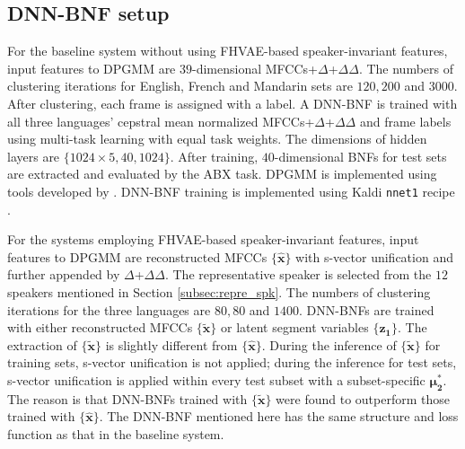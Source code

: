 \documentclass[a4paper]{article}
\begin{document}
\subsection{DNN-BNF setup}
For the baseline system without using FHVAE-based speaker-invariant features,  input features  to DPGMM are  $39$-dimensional MFCCs+$\Delta$+$\Delta\Delta$. 
The numbers of clustering iterations for English, French and Mandarin sets are $120,200$ and $3000$. After clustering, each frame is assigned with a label. A DNN-BNF is trained with all three languages'  cepstral mean normalized MFCCs+$\Delta$+$\Delta\Delta$ and frame labels using  multi-task learning with equal task weights. 
The dimensions of hidden layers are $\{1024\times5,40,1024\}$.
After training, $40$-dimensional BNFs for test sets are extracted and evaluated by the ABX task. DPGMM is implemented using tools developed by \cite{chang2013parallel}. DNN-BNF training is implemented using Kaldi \texttt{nnet1} recipe \cite{povey2011kaldi}.

For the systems employing FHVAE-based speaker-invariant features,  input features to DPGMM are reconstructed MFCCs $\{\bm{\hat{x}}\}$ with s-vector unification and further appended by $\Delta$+$\Delta\Delta$. 
The representative speaker is selected from the $12$ speakers mentioned in Section \ref{subsec:repre_spk}. 
The numbers of clustering iterations for the three languages are $80,80$ and $1400$. 
DNN-BNFs are trained with either reconstructed MFCCs $\{\bm{\tilde{x}}\}$ or latent segment variables $\{\bm{z_1}\}$. The extraction of $\{\bm{\tilde{x}}\}$  is slightly different from $\{\bm{\hat{x}}\}$. During the  inference of $\{\bm{\tilde{x}}\}$ for  training sets, s-vector unification is not applied;  during the inference for  test sets, s-vector unification is applied within every test subset with a subset-specific $\bm{\mu_2^*}$. 
The reason is that  DNN-BNFs  trained with $\{\bm{\tilde{x}}\}$ were found to outperform those trained with $\{\bm{\hat{x}}\}$.
The DNN-BNF mentioned here has
the same structure and loss function as that in the baseline system.
\end{document}
